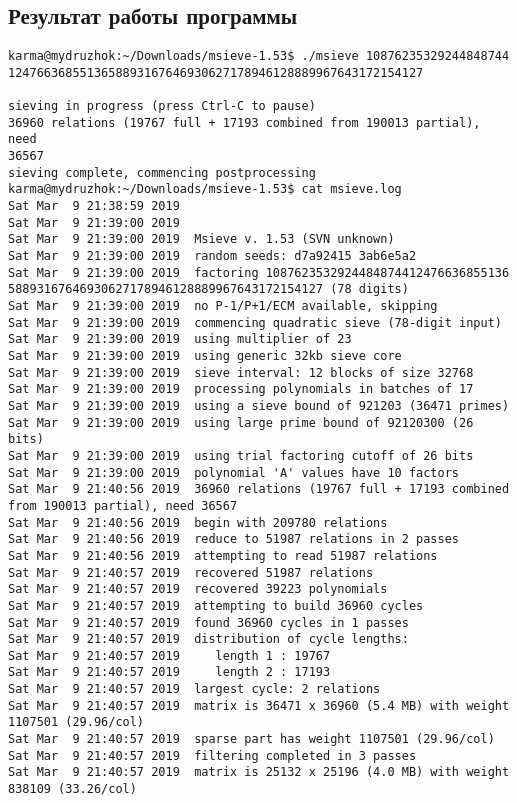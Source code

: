 \documentclass[12pt]{article}
\begin{document}
\subsection*{Результат работы программы}
\begin{lstlisting}
karma@mydruzhok:~/Downloads/msieve-1.53$ ./msieve 10876235329244848744
1247663685513658893167646930627178946128889967643172154127

sieving in progress (press Ctrl-C to pause)
36960 relations (19767 full + 17193 combined from 190013 partial), need 
36567
sieving complete, commencing postprocessing
karma@mydruzhok:~/Downloads/msieve-1.53$ cat msieve.log 
Sat Mar  9 21:38:59 2019  
Sat Mar  9 21:39:00 2019  
Sat Mar  9 21:39:00 2019  Msieve v. 1.53 (SVN unknown)
Sat Mar  9 21:39:00 2019  random seeds: d7a92415 3ab6e5a2
Sat Mar  9 21:39:00 2019  factoring 1087623532924484874412476636855136
58893167646930627178946128889967643172154127 (78 digits)
Sat Mar  9 21:39:00 2019  no P-1/P+1/ECM available, skipping
Sat Mar  9 21:39:00 2019  commencing quadratic sieve (78-digit input)
Sat Mar  9 21:39:00 2019  using multiplier of 23
Sat Mar  9 21:39:00 2019  using generic 32kb sieve core
Sat Mar  9 21:39:00 2019  sieve interval: 12 blocks of size 32768
Sat Mar  9 21:39:00 2019  processing polynomials in batches of 17
Sat Mar  9 21:39:00 2019  using a sieve bound of 921203 (36471 primes)
Sat Mar  9 21:39:00 2019  using large prime bound of 92120300 (26 bits)
Sat Mar  9 21:39:00 2019  using trial factoring cutoff of 26 bits
Sat Mar  9 21:39:00 2019  polynomial 'A' values have 10 factors
Sat Mar  9 21:40:56 2019  36960 relations (19767 full + 17193 combined 
from 190013 partial), need 36567
Sat Mar  9 21:40:56 2019  begin with 209780 relations
Sat Mar  9 21:40:56 2019  reduce to 51987 relations in 2 passes
Sat Mar  9 21:40:56 2019  attempting to read 51987 relations
Sat Mar  9 21:40:57 2019  recovered 51987 relations
Sat Mar  9 21:40:57 2019  recovered 39223 polynomials
Sat Mar  9 21:40:57 2019  attempting to build 36960 cycles
Sat Mar  9 21:40:57 2019  found 36960 cycles in 1 passes
Sat Mar  9 21:40:57 2019  distribution of cycle lengths:
Sat Mar  9 21:40:57 2019     length 1 : 19767
Sat Mar  9 21:40:57 2019     length 2 : 17193
Sat Mar  9 21:40:57 2019  largest cycle: 2 relations
Sat Mar  9 21:40:57 2019  matrix is 36471 x 36960 (5.4 MB) with weight
1107501 (29.96/col)
Sat Mar  9 21:40:57 2019  sparse part has weight 1107501 (29.96/col)
Sat Mar  9 21:40:57 2019  filtering completed in 3 passes
Sat Mar  9 21:40:57 2019  matrix is 25132 x 25196 (4.0 MB) with weight
838109 (33.26/col)

\end{lstlisting}
\end{document}
